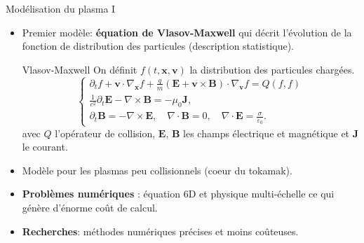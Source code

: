 \begin{frame}{Mod\'elisation du plasma I}
  \small
  \begin{itemize}
\item Premier mod\`ele: \textbf{\'equation de Vlasov-Maxwell} qui d\'ecrit l'\'evolution de la fonction de distribution des particules (description statistique).
\begin{block}{Vlasov-Maxwell}
On d\'efinit $f(t,\mathbf{x},\mathbf{v})$ la distribution  des particules charg\'ees. 
$$
\left\{\begin{array}{l}
\partial_t f +\mathbf{v}\cdot\nabla_{\mathbf{x}} f+ \frac{q}{m}\left(\mathbf{E}+\mathbf{v}\times\mathbf{B}\right)\cdot\nabla_{\mathbf{v}} f= Q(f,f)\\
 \frac{1}{c^2}\partial_t \mathbf{E}-\nabla \times \mathbf{B}= -\mu_0\mathbf{J},\\
\partial_t \mathbf{B}=-\nabla \times \mathbf{E},\quad \nabla \cdot\mathbf{B}=0,\quad \nabla \cdot \mathbf{E} =\frac{\sigma}{\varepsilon_0}.
\end{array}\right.
$$
avec $Q$ l'op\'erateur de collision, $\mathbf{E}$, $\mathbf{B}$ les champs \'electrique et magn\'etique et $\mathbf{J}$ le courant.
\end{block}
\item Mod\`ele  pour les plasmas peu collisionnels (coeur du tokamak).
\item \textbf{Probl\`emes num\'eriques} :  \'equation 6D et physique multi-\'echelle ce qui g\'en\`ere  d'\'enorme co\^{u}t de calcul.
\item \textbf{Recherches}: m\'ethodes num\'eriques pr\'ecises et moins co\^{u}teuses.
\end{itemize}
\end{frame}

